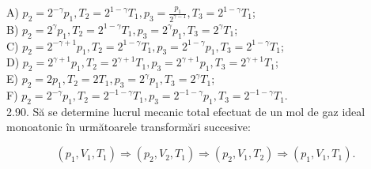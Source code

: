 A) $p_{2}=2^{-\gamma} p_{1}, T_{2}=2^{1-\gamma} T_{1}, p_{3}=\frac{p_{1}}{2^{\gamma-1}}, T_{3}=2^{1-\gamma} T_{1}$;\\
B) $p_{2}=2^{\gamma} p_{1}, T_{2}=2^{1-\gamma} T_{1}, p_{3}=2^{\gamma} p_{1}, T_{3}=2^{\gamma} T_{1}$;\\
C) $p_{2}=2^{-\gamma+1} p_{1}, T_{2}=2^{1-\gamma} T_{1}, p_{3}=2^{1-\gamma} p_{1}, T_{3}=2^{1-\gamma} T_{1}$;\\
D) $p_{2}=2^{\gamma+1} p_{1}, T_{2}=2^{\gamma+1} T_{1}, p_{3}=2^{\gamma+1} p_{1}, T_{3}=2^{\gamma+1} T_{1}$;\\
E) $p_{2}=2 p_{1}, T_{2}=2 T_{1}, p_{3}=2^{\gamma} p_{1}, T_{3}=2^{\gamma} T_{1}$;\\
F) $p_{2}=2^{-\gamma} p_{1}, T_{2}=2^{-1-\gamma} T_{1}, p_{3}=2^{-1-\gamma} p_{1}, T_{3}=2^{-1-\gamma} T_{1}$.\\
2.90. Să se determine lucrul mecanic total efectuat de un mol de gaz ideal monoatonic în următoarele transformări succesive:

$$
\left(p_{1}, V_{1}, T_{1}\right) \Rightarrow\left(p_{2}, V_{2}, T_{1}\right) \Rightarrow\left(p_{2}, V_{1}, T_{2}\right) \Rightarrow\left(p_{1}, V_{1}, T_{1}\right) .
$$

